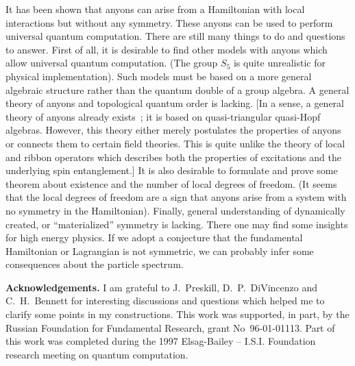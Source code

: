 \documentclass[12pt]{article}
\begin{document}
It has been shown that anyons can arise from a Hamiltonian with local
interactions but without any symmetry. These anyons can be used to perform
universal quantum computation. There are still many things to do and questions
to answer. First of all, it is desirable to find other models with anyons
which allow universal quantum computation. (The group $S_5$ is quite
unrealistic for physical implementation). Such models must be based on a more
general algebraic structure rather than the quantum double of a group
algebra. A general theory of anyons and topological quantum order is lacking.
[In a sense, a general theory of anyons already exists~\cite{DPR}; it is based
on quasi-triangular quasi-Hopf algebras. However, this theory either merely
postulates the properties of anyons or connects them to certain field
theories. This is quite unlike the theory of local and ribbon operators which
describes both the properties of excitations and the underlying spin
entanglement.] It is also desirable to formulate and prove some theorem about
existence and the number of local degrees of freedom. (It seems that the local
degrees of freedom are a sign that anyons arise from a system with no symmetry
in the Hamiltonian). Finally, general understanding of dynamically created, or
``materialized'' symmetry is lacking. There one may find some insights for
high energy physics. If we adopt a conjecture that the fundamental Hamiltonian
or Lagrangian is not symmetric, we can probably infer some consequences about
the particle spectrum.
\bigskip

\noindent\textbf{\large Acknowledgements.} I am grateful to J.~Preskill,
D.~P.~DiVincenzo and C.~H.~Bennett for interesting discussions and questions
which helped me to clarify some points in my constructions. This work was
supported, in part, by the Russian Foundation for Fundamental Research, grant
No~96-01-01113. Part of this work was completed during the 1997 
Elsag-Bailey -- I.S.I. Foundation research meeting on quantum computation.
\end{document}
